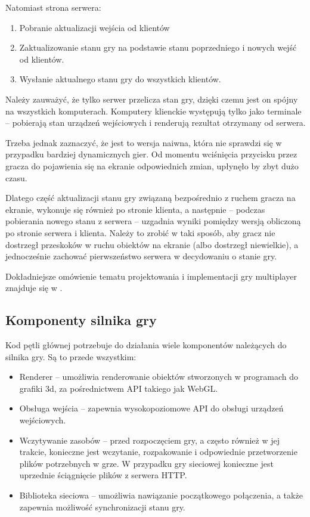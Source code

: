 Natomiast strona serwera:

\begin{enumerate}
\item Pobranie aktualizacji wejścia od klientów
\item Zaktualizowanie stanu gry na podstawie stanu poprzedniego i nowych wejść od klientów.
\item Wysłanie aktualnego stanu gry do wszystkich klientów.
\end{enumerate}

Należy zauważyć, że tylko serwer przelicza stan gry, dzięki czemu jest on spójny na wszystkich
komputerach. Komputery klienckie występują tylko jako terminale -- pobierają
stan urządzeń wejściowych i renderują rezultat otrzymany od serwera.

Trzeba jednak zaznaczyć, że jest to wersja naiwna, która nie sprawdzi się
w przypadku bardziej dynamicznych gier. Od momentu wciśnięcia przycisku przez gracza
do pojawienia się na ekranie odpowiednich zmian, upłynęło by zbyt dużo czasu.

Dlatego część aktualizacji stanu gry związaną bezpośrednio z ruchem gracza na ekranie,
wykonuje się również po stronie klienta, a następnie -- podczas pobierania nowego
stanu z serwera -- uzgadnia wyniki pomiędzy wersją obliczoną po stronie serwera i klienta.
Należy to zrobić w taki sposób, aby gracz nie dostrzegł przeskoków w ruchu obiektów na ekranie
(albo dostrzegł niewielkie), a jednocześnie zachować pierwszeństwo serwera w decydowaniu
o stanie gry.

Dokładniejsze omówienie tematu projektowania i implementacji gry multiplayer znajduje
się w \cite{algorithms-networking}.

\subsection{Komponenty silnika gry}
\label{ssec:komponentyGry}

Kod pętli głównej potrzebuje do działania wiele komponentów należących do
silnika gry. Są to przede wszystkim:

\begin{itemize}
\item Renderer -- umożliwia renderowanie obiektów stworzonych w programach do grafiki 3d,
  za pośrednictwem API takiego jak WebGL.
\item Obsługa wejścia -- zapewnia wysokopoziomowe API do obsługi urządzeń wejściowych.
\item Wczytywanie zasobów -- przed rozpoczęciem gry, a często również w jej trakcie,
  konieczne jest wczytanie, rozpakowanie i odpowiednie przetworzenie plików potrzebnych
  w grze. W przypadku gry sieciowej konieczne jest uprzednie ściągnięcie plików z
  serwera HTTP.
\item Biblioteka sieciowa -- umożliwia nawiązanie początkowego połączenia, a także zapewnia
  możliwość synchronizacji stanu gry.
\end{itemize}

